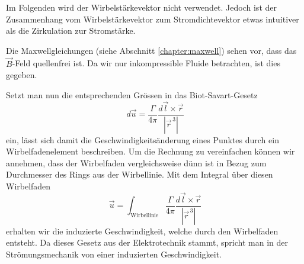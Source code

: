 Im Folgenden wird der Wirbelstärkevektor nicht verwendet.
Jedoch ist der Zusammenhang vom Wirbelstärkevektor zum Stromdichtevektor etwas intuitiver als die Zirkulation zur Stromstärke.

Die Maxwellgleichungen (siehe Abschnitt \ref{chapter:maxwell}) sehen vor, dass das \(\vec{B}\)-Feld quellenfrei ist. 
Da wir nur inkompressible Fluide betrachten, ist dies gegeben.

Setzt man nun die entsprechenden Grössen in das Biot-Savart-Gesetz
\[
d\vec{u}
=
\frac{\Gamma}{4\pi}\frac{d\vec{l} \times \vec{r}}{\left\lvert \vec{r}^{\,3}\right\rvert }
\]
ein, lässt sich damit die Geschwindigkeitsänderung eines Punktes durch ein Wirbelfadenelement beschreiben.
Um die Rechnung zu vereinfachen können wir annehmen, dass der Wirbelfaden vergleichsweise dünn ist in Bezug zum Durchmesser des Rings aus der Wirbellinie.
Mit dem Integral über diesen Wirbelfaden
\begin{equation}
    \label{Wirbelringe:eq:WirbelSpeed}
    \vec{u}
    =
    \int_{\text{Wirbellinie}} \frac{\Gamma}{4\pi}\frac{d\vec{l} \times \vec{r}}{\left\lvert \vec{r}^{\,3}\right\rvert}
\end{equation}
erhalten wir die induzierte Geschwindigkeit, welche durch den Wirbelfaden entsteht.
Da dieses Gesetz aus der Elektrotechnik stammt, spricht man in der Strömungsmechanik von einer induzierten Geschwindigkeit.

